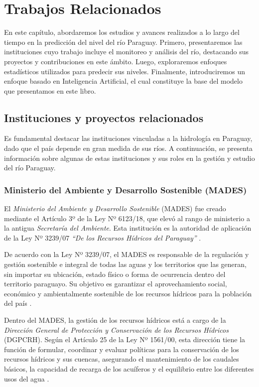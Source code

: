 \clearpage %
\chapter{Trabajos Relacionados}
\label{sec:Trabajos Relacionados}

En este capítulo, abordaremos los estudios y avances realizados a lo largo del tiempo en la predicción del nivel del río Paraguay. Primero, presentaremos las instituciones cuyo trabajo incluye el monitoreo y análisis del río, destacando sus proyectos y contribuciones en este ámbito. Luego, exploraremos enfoques estadísticos utilizados para predecir sus niveles. Finalmente, introduciremos un enfoque basado en Inteligencia Artificial, el cual constituye la base del modelo que presentamos en este libro.


\section{Instituciones y proyectos relacionados}

Es fundamental destacar las instituciones vinculadas a la hidrología en Paraguay, dado que el país depende en gran medida de sus ríos. A continuación, se presenta información sobre algunas de estas instituciones y sus roles en la gestión y estudio del río Paraguay.

\subsection{Ministerio del Ambiente y Desarrollo Sostenible (MADES)}

El \textit{Ministerio del Ambiente y Desarrollo Sostenible} (MADES) fue creado mediante el Artículo 3º de la Ley Nº 6123/18, que elevó al rango de ministerio a la antigua \textit{Secretaría del Ambiente}. Esta institución es la autoridad de aplicación de la Ley Nº 3239/07 \textit{“De los Recursos Hídricos del Paraguay”} \cite{MAD23}.

De acuerdo con la Ley Nº 3239/07, el MADES es responsable de la regulación y gestión sostenible e integral de todas las aguas y los territorios que las generan, sin importar su ubicación, estado físico o forma de ocurrencia dentro del territorio paraguayo. Su objetivo es garantizar el aprovechamiento social, económico y ambientalmente sostenible de los recursos hídricos para la población del país \cite{MAD23}.

Dentro del MADES, la gestión de los recursos hídricos está a cargo de la \textit{Dirección General de Protección y Conservación de los Recursos Hídricos} (DGPCRH). Según el Artículo 25 de la Ley Nº 1561/00, esta dirección tiene la función de formular, coordinar y evaluar políticas para la conservación de los recursos hídricos y sus cuencas, asegurando el mantenimiento de los caudales básicos, la capacidad de recarga de los acuíferos y el equilibrio entre los diferentes usos del agua \cite{MAD23}.

